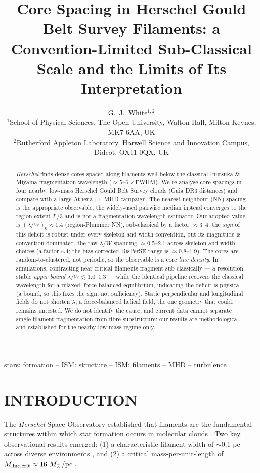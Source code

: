 \documentclass[usenatbib,twoside,twocolumn]{mnras}
\title[Sub-classical core spacing in HGBS filaments]{Core Spacing in Herschel Gould Belt Survey Filaments: a Convention-Limited Sub-Classical Scale and the Limits of Its Interpretation}
\author[G.~J.~White]{G.~J.~White$^{1,2}$\\
$^{1}$School of Physical Sciences, The Open University, Walton Hall, Milton Keynes, MK7 6AA, UK\\
$^{2}$Rutherford Appleton Laboratory, Harwell Science and Innovation Campus, Didcot, OX11 0QX, UK}
\begin{document}
\maketitle

\begin{abstract}
\textit{Herschel} finds dense cores spaced along filaments well below the classical Inutsuka \& Miyama fragmentation wavelength ($\approx5$--$6\times$FWHM). We re-analyse core spacings in four nearby, low-mass Herschel Gould Belt Survey clouds (Gaia DR3 distances) and compare with a large Athena++ MHD campaign. The nearest-neighbour (NN) spacing is the appropriate observable; the widely-used pairwise median instead converges to the region extent $L/3$ and is not a fragmentation-wavelength estimator. Our adopted value is $(\lambda/W)_0\approx1.4$ (region-Plummer NN), sub-classical by a factor $\approx3$--$4$: the \emph{sign} of this deficit is robust under every skeleton and width convention, but its magnitude is convention-dominated, the raw $\lambda/W$ spanning $\approx0.5$--$2.1$ across skeleton and width choices (a factor $\sim$4; the bias-corrected DisPerSE range is $\approx0.8$--$1.9$). The cores are random-to-clustered, not periodic, so the observable is a core \emph{line density}. In simulations, contracting near-critical filaments fragment sub-classically --- a resolution-stable \emph{upper bound} $\lambda/W\lesssim1.0$--$1.3$ --- while the identical pipeline recovers the classical wavelength for a relaxed, force-balanced equilibrium, indicating the deficit is physical (a bound, so this fixes the sign, not sufficiency). Static perpendicular and longitudinal fields do not shorten $\lambda$; a force-balanced helical field, the one geometry that could, remains untested. We do not identify the cause, and current data cannot separate single-filament fragmentation from fibre substructure: our results are methodological, and established for the nearby low-mass regime only.
\end{abstract}


\begin{keywords}
stars: formation -- ISM: structure -- ISM: filaments -- MHD -- turbulence
\end{keywords}

\section{INTRODUCTION}

The \textit{Herschel} Space Observatory established that filaments are the fundamental structures within which star formation occurs in molecular clouds \citep{Andre2010}. Two key observational results emerged: (1) a characteristic filament width of $\sim$0.1 pc across diverse environments \citep{Arzoumanian2011}, and (2) a critical mass-per-unit-length of $M_{\rm line,crit} \approx 16~M_\odot$/pc \citep{Ostriker1964}.
\end{document}
